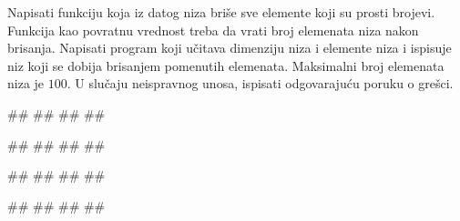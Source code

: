 \begin{Exercise}[label=p.izbacivanje_prostih_elemenata] 
Napisati funkciju koja iz datog niza briše sve elemente koji su prosti brojevi. 
Funkcija kao povratnu vrednost treba da vrati broj elemenata niza nakon brisanja. 
Napisati program koji učitava dimenziju niza i elemente niza i ispisuje niz koji se dobija 
brisanjem pomenutih elemenata. 
Maksimalni broj elemenata niza je $100$.
U slučaju neispravnog unosa, ispisati odgovarajuću poruku o grešci. 

\begin{miditest}
\begin{upotreba}{1}
#\naslovInt#
##
##
##
\end{upotreba}
\end{miditest}
\begin{miditest}
\begin{upotreba}{2}
#\naslovInt#
##
##
##
\end{upotreba}
\end{miditest}

\begin{miditest}
\begin{upotreba}{3}
#\naslovInt#
##
##
##
\end{upotreba}
\end{miditest}
\begin{miditest}
\begin{upotreba}{4}
#\naslovInt#
##
##
##
\end{upotreba}
\end{miditest}
\end{Exercise}

\ifresenja
\begin{Answer}[ref=p.izbacivanje_prostih_elemenata]
\end{Answer}
\fi


